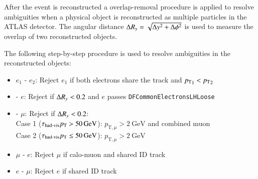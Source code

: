 
After the event is reconstructed a overlap-removal procedure is applied to
resolve ambiguities when a physical object is reconstructed as multiple
particles in the ATLAS detector. The angular distance $\Delta R_y =
\sqrt{\Delta y^2 + \Delta \phi^2}$ is used to measure the overlap of two
reconstructed objects. 

The following step-by-step procedure is used to resolve ambiguities in
the reconstructed objects:
\begin{itemize}

\item $e_1$ - $e_2$: Reject $e_1$ if both electrons share the track and ${p_{\text{T}}}_1
  < {p_{\text{T}}}_2$

\item \tauhadvis - $e$: Reject \tauhadvis if $\Delta R_y < 0.2$ and $e$ passes \verb|DFCommonElectronsLHLoose|

\item \tauhadvis - $\mu$: Reject \tauhadvis if $\Delta R_y < 0.2$:\\
  Case 1 ($\tau_{\text{had-vis}} p_{\text{T}} > \SI{50}{\ensuremath{\text{GeV}}}$): $p_{\text{T}, \mu} > \SI{2}{\GeV}$
  and combined muon\\
  Case 2 ($\tau_{\text{had-vis}} p_{\text{T}} \leq \SI{50}{\ensuremath{\text{GeV}}}$): $p_{\text{T}, \mu} > \SI{2}{\GeV}$

\item $\mu$ - $e$: Reject $\mu$ if calo-muon and shared ID track
\item $e$ - $\mu$: Reject $e$ if shared ID track


\end{itemize}
